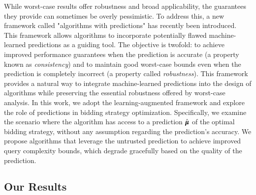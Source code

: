 While worst-case results offer robustness and broad applicability, the guarantees they provide can sometimes be overly pessimistic. To address this, a new framework called "algorithms with predictions" has recently been introduced. This framework allows algorithms to incorporate potentially flawed machine-learned predictions as a guiding tool. The objective is twofold: to achieve improved performance guarantees when the prediction is accurate (a property known as \emph{consistency}) and to maintain good worst-case bounds even when the prediction is completely incorrect (a property called \emph{robustness}). This framework provides a natural way to integrate machine-learned predictions into the design of algorithms while preserving the essential robustness offered by worst-case analysis. In this work, we adopt the learning-augmented framework and explore the role of predictions in bidding strategy optimization. Specifically, we examine the scenario where the algorithm has access to a prediction $\hat{\pmb{\mu}}$ of the optimal bidding strategy, without any assumption regarding the prediction's accuracy. We propose algorithms that leverage the untrusted prediction to achieve improved query complexity bounds, which degrade gracefully based on the quality of the prediction.

\subsection{Our Results}


